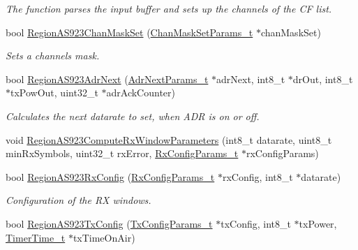 \begin{DoxyCompactItemize}
\begin{DoxyCompactList}\small\item\em The function parses the input buffer and sets up the channels of the CF list. \end{DoxyCompactList}\item 
bool \mbox{\hyperlink{group___r_e_g_i_o_n_a_s923_gab493d29d1037f6b6f47baf0cfc2faf47}{Region\+A\+S923\+Chan\+Mask\+Set}} (\mbox{\hyperlink{group___r_e_g_i_o_n_ga6d24f7da136006410827dfb29f6b9b9e}{Chan\+Mask\+Set\+Params\+\_\+t}} $\ast$chan\+Mask\+Set)
\begin{DoxyCompactList}\small\item\em Sets a channels mask. \end{DoxyCompactList}\item 
bool \mbox{\hyperlink{group___r_e_g_i_o_n_a_s923_ga38146f12b31fadadda54344d9f5d7e49}{Region\+A\+S923\+Adr\+Next}} (\mbox{\hyperlink{group___r_e_g_i_o_n_ga567c2742622326b350b4e91bbf61b4ce}{Adr\+Next\+Params\+\_\+t}} $\ast$adr\+Next, int8\+\_\+t $\ast$dr\+Out, int8\+\_\+t $\ast$tx\+Pow\+Out, uint32\+\_\+t $\ast$adr\+Ack\+Counter)
\begin{DoxyCompactList}\small\item\em Calculates the next datarate to set, when A\+DR is on or off. \end{DoxyCompactList}\item 
void \mbox{\hyperlink{group___r_e_g_i_o_n_a_s923_ga33875aeda67698b7be396f9ef9b1d081}{Region\+A\+S923\+Compute\+Rx\+Window\+Parameters}} (int8\+\_\+t datarate, uint8\+\_\+t min\+Rx\+Symbols, uint32\+\_\+t rx\+Error, \mbox{\hyperlink{group___r_e_g_i_o_n_ga375c038078dfcfc7ef14280021db719e}{Rx\+Config\+Params\+\_\+t}} $\ast$rx\+Config\+Params)
\item 
bool \mbox{\hyperlink{group___r_e_g_i_o_n_a_s923_ga236a04c03ccf327e5a3d1a0130e19e10}{Region\+A\+S923\+Rx\+Config}} (\mbox{\hyperlink{group___r_e_g_i_o_n_ga375c038078dfcfc7ef14280021db719e}{Rx\+Config\+Params\+\_\+t}} $\ast$rx\+Config, int8\+\_\+t $\ast$datarate)
\begin{DoxyCompactList}\small\item\em Configuration of the RX windows. \end{DoxyCompactList}\item 
bool \mbox{\hyperlink{group___r_e_g_i_o_n_a_s923_gab4e1c5c1e67df4682b90950164afec03}{Region\+A\+S923\+Tx\+Config}} (\mbox{\hyperlink{group___r_e_g_i_o_n_gabed730d4d04b0b60d4b6d1966d3f21d3}{Tx\+Config\+Params\+\_\+t}} $\ast$tx\+Config, int8\+\_\+t $\ast$tx\+Power, \mbox{\hyperlink{utilities_8h_a4215ca43d3e953099ea758ce428599d0}{Timer\+Time\+\_\+t}} $\ast$tx\+Time\+On\+Air)

\end{DoxyCompactItemize}

